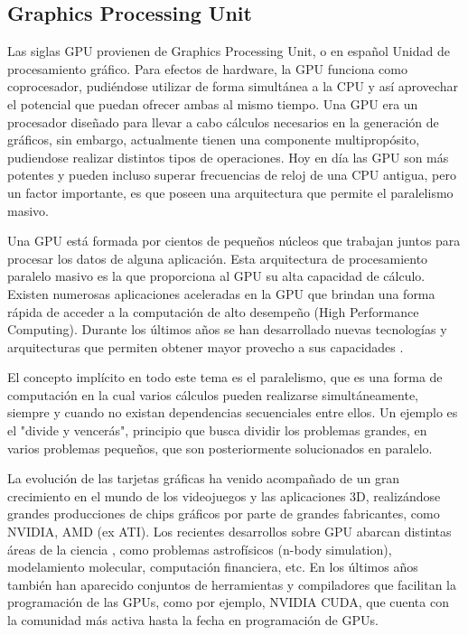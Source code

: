 \subsection{Graphics Processing Unit}
Las siglas GPU provienen de Graphics Processing Unit, o en español Unidad de procesamiento gráfico. Para efectos de hardware, la GPU funciona como coprocesador,
pudiéndose utilizar de forma simultánea a la CPU y así aprovechar el potencial que puedan ofrecer ambas al mismo tiempo.
Una GPU era un procesador diseñado para llevar a cabo cálculos necesarios en la generación de gráficos, sin embargo, actualmente tienen una componente multipropósito,
pudiendose realizar distintos tipos de operaciones. Hoy en día las GPU son más potentes y pueden incluso superar frecuencias de reloj de una CPU antigua, pero un factor
importante, es que poseen una arquitectura que permite el paralelismo masivo.

Una GPU está formada por cientos de pequeños núcleos que trabajan juntos para procesar los datos de alguna aplicación. Esta arquitectura de procesamiento paralelo
masivo es la que proporciona al GPU su alta capacidad de cálculo. Existen numerosas aplicaciones aceleradas en la GPU que brindan una forma rápida de acceder
a la computación de alto desempeño (High Performance Computing). Durante los últimos años se han desarrollado nuevas tecnologías y arquitecturas
que permiten obtener mayor provecho a sus capacidades \cite{owens2007gpu}.

El concepto implícito en todo este tema es el paralelismo, que es una forma de computación en la cual varios cálculos pueden realizarse simultáneamente,
siempre y cuando no existan dependencias secuenciales entre ellos. Un ejemplo es el "divide y vencerás", principio que busca dividir los problemas grandes, en
varios problemas pequeños, que son posteriormente solucionados en paralelo.

La evolución de las tarjetas gráficas ha venido acompañado de un gran crecimiento en el mundo de los videojuegos y las aplicaciones 3D, realizándose grandes
producciones de chips gráficos por parte de grandes fabricantes, como NVIDIA, AMD (ex ATI). Los recientes desarrollos sobre GPU abarcan distintas áreas de la ciencia \cite{kirk2010programming},
como problemas astrofísicos (n-body simulation), modelamiento molecular, computación financiera, etc. En los últimos años también han aparecido 
conjuntos de herramientas y compiladores que facilitan la programación de las GPUs, como por ejemplo, NVIDIA CUDA, que cuenta con la comunidad más activa hasta 
la fecha en programación de GPUs.

